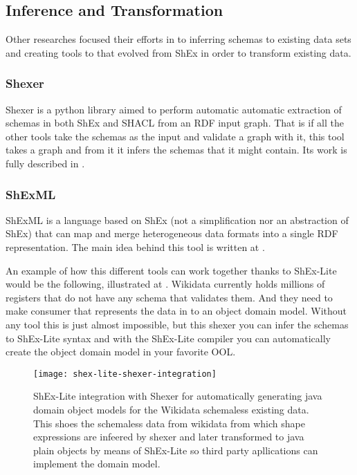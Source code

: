 \subsection{Inference and Transformation}
Other researches focused their efforts in to inferring schemas to existing data sets and creating tools to that evolved from ShEx in order to transform existing data.

\subsubsection{Shexer}
Shexer is a python library aimed to perform automatic automatic extraction of schemas in both ShEx and SHACL from an RDF input graph. That is if all the other tools take the schemas as the input and validate a graph with it, this tool takes a graph and from it it infers the schemas that it might contain. Its work is fully described in .

\subsubsection{ShExML}
ShExML is a language based on ShEx (not a simplification nor an abstraction of ShEx) that can map and merge heterogeneous data formats into a single RDF representation. The main idea behind this tool is written at .

\bigskip

An example of how this different tools can work together thanks to ShEx-Lite would be the following, illustrated at .
Wikidata currently holds millions of registers that do not have any schema that validates them. And they need to make consumer that represents the data in to an object domain model. Without any tool this is just almost impossible, but this shexer you can infer the schemas to ShEx-Lite syntax and with the ShEx-Lite compiler you can automatically create the object domain model in your favorite OOL.

\begin{figure*}[h!]
	\texttt{[image: shex-lite-shexer-integration]}
	\caption[ShEx-Lite integration with Shexer]{ShEx-Lite integration with Shexer for automatically generating java domain object models for the Wikidata schemaless existing data. This shoes the schemaless data from wikidata from which shape expressions are infeered by shexer and later transformed to java plain objects by means of ShEx-Lite so third party apllications can implement the domain model.}
\end{figure*}